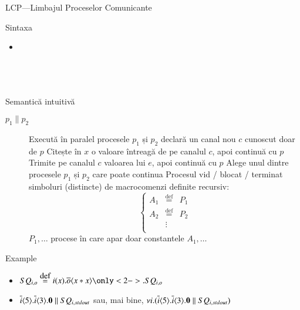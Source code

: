 \documentclass[xcolor=pdftex,romanian,colorlinks]{beamer}
\begin{document}
\begin{section}{LCP—Limbajul Proceselor Comunicante}
\begin{frame}{Sintaxa}
\begin{syntaxBlock}{\Proc}
{\begin{itemize}
\item[]\renewcommand{\defSort}{\Variable}
\\
\renewcommand{\defSort}{\Channel}
\\
\renewcommand{\defSort}{\Int}
\\
\renewcommand{\defSort}{\Bool}
\syntax{\Strue \mid \Sfalse}{}
\\
\renewcommand{\defSort}{\iop}
\syntax{\terminal{+} \Smid \terminal{-}\Smid \ldots}{}
\renewcommand{\defSort}{\bop}
\syntax{\terminal{=} \Smid \terminal{<}\Smid \ldots}{}
\end{itemize}
}
\end{syntaxBlock}
\end{frame}

\begin{frame}{Semantică intuitivă}
\begin{description}
\item[$p_1\parallel p_2$] Execută în paralel procesele $p_1$ și $p_2$
\vitem[$\nu c . p$] declară un canal nou $c$ cunoscut doar de $p$
\vitem[$c(x).p$] Citește în $x$ o valoare întreagă de pe canalul $c$, apoi continuă cu $p$
\vitem[$\out{c}{e}. p$] Trimite pe  canalul $c$ valoarea lui $e$, apoi continuă cu $p$
\vitem[$p_1 + p_2$] Alege unul dintre procesele $p_1$ și $p_2$ care poate continua
\vitem[$\zero$] Procesul vid / blocat / terminat
\vitem[$A$] simboluri (distincte) de macrocomenzi definite recursiv:
\[\left\{\begin{array}{lcl}
A_1 & \stackrel{\mbox{def}}{=} & P_1 \\
A_2 & \stackrel{\mbox{def}}{=} & P_2 \\
& \vdots & \\
\end{array}\right.\] 
$P_1,\ldots$ procese în care apar doar constantele $A_1,\ldots $
\end{description}
\end{frame}

\begin{subsection}{Example}
\begin{frame}
\begin{itemize}
\item $SQ_{i,o} \defeq i(x).\out{o}{x*x} \only<2->{. SQ_{i,o}}$
\item $\overline{i}\langle{5}\rangle . \overline{i}\langle{3}\rangle . \mathbf{0} \parallel SQ_{i,stdout}$ sau, mai bine, $\nu i.(\overline{i}\langle{5}\rangle . \overline{i}\langle{3}\rangle . \mathbf{0} \parallel SQ_{i,stdout})$ 


\end{itemize}
\end{frame}
\end{subsection}
\end{section}
\end{document}
